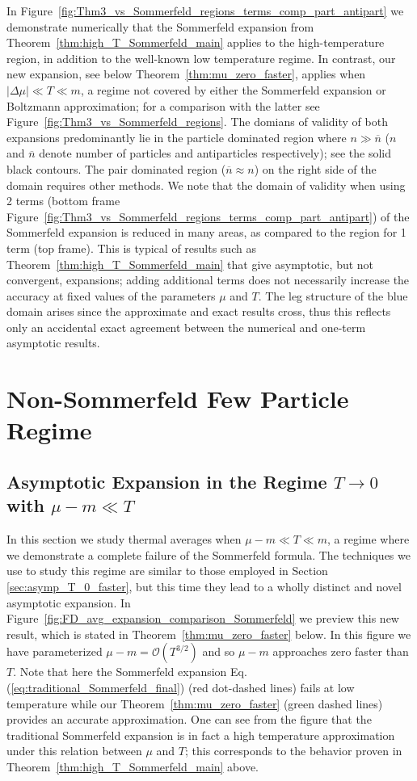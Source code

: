 \documentclass[sn-mathphys,Numbered]{sn-jnl}
\newcommand{\req}[1]{Eq.\,(\ref{#1})}
\newcommand{\rf}[1]{Figure~{\ref{#1}}}
\newcommand{\rTh}[1]{Theorem~{\ref{#1}}}
\begin{document}
In \rf{fig:Thm3_vs_Sommerfeld_regions_terms_comp_part_antipart} we demonstrate numerically that the Sommerfeld expansion from \rTh{thm:high_T_Sommerfeld_main} applies to the high-temperature region, in addition to the well-known low temperature regime. In contrast, our new expansion, see below \rTh{thm:mu_zero_faster}, applies when $|\Delta\mu|\ll T\ll m$, a regime not covered by either the Sommerfeld expansion or Boltzmann approximation; for a comparison with the latter see \rf{fig:Thm3_vs_Sommerfeld_regions}. The domians of validity of both expansions predominantly lie in the particle dominated region where $n\gg \overline{n}$ ($n$ and $\overline{n}$ denote number of particles and antiparticles respectively); see the solid black contours. The pair dominated region ($\overline{n}\approx n$) on the right side of the domain requires other methods. We note that the domain of validity when using 2 terms (bottom frame \rf{fig:Thm3_vs_Sommerfeld_regions_terms_comp_part_antipart}) of the Sommerfeld expansion is reduced in many areas, as compared to the region for 1 term (top frame). This is typical of results such as \rTh{thm:high_T_Sommerfeld_main} that give asymptotic, but not convergent, expansions; adding additional terms does not necessarily increase the accuracy at fixed values of the parameters $\mu$ and $T$. The leg structure of the blue domain arises since the approximate and exact results cross, thus this reflects only an accidental exact agreement between the numerical and one-term asymptotic results. 









\section{Non-Sommerfeld Few Particle Regime}\label{sec:beyondSommer}
\subsection{Asymptotic Expansion in the Regime $T\to 0$ with $\mu-m\ll T$}\label{sec:asympt_Delta_mu_order_T}
In this section we study thermal averages when $\mu-m\ll T\ll m$, a regime where we demonstrate a complete failure of the Sommerfeld formula. The techniques we use to study this regime are similar to those employed in Section \ref{sec:asymp_T_0_faster}, but this time they lead to a wholly distinct and novel asymptotic expansion. In \rf{fig:FD_avg_expansion_comparison_Sommerfeld} we preview this new result, which is stated in \rTh{thm:mu_zero_faster} below. In this figure we have parameterized $\mu-m=\mathcal{O}(T^{3/2})$ and so $\mu-m$ approaches zero faster than $T$. Note that here the Sommerfeld expansion \req{eq:traditional_Sommerfeld_final} (red dot-dashed lines) fails at low temperature while our \rTh{thm:mu_zero_faster} (green dashed lines) provides an accurate approximation. One can see from the figure that the traditional Sommerfeld expansion is in fact a high temperature approximation under this relation between $\mu$ and $T$; this corresponds to the behavior proven in \rTh{thm:high_T_Sommerfeld_main} above.
\end{document}
